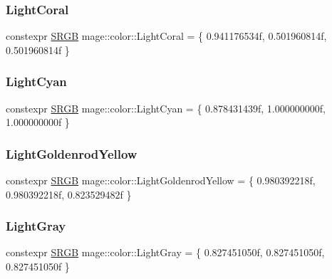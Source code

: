 \hypertarget{namespacemage_1_1color_a8cadd437a344e0286c3f2575ba343b45}{}\label{namespacemage_1_1color_a8cadd437a344e0286c3f2575ba343b45} 
\subsubsection{\texorpdfstring{Light\+Coral}{LightCoral}}
{\footnotesize\ttfamily constexpr \hyperlink{structmage_1_1_s_r_g_b}{S\+R\+GB} mage\+::color\+::\+Light\+Coral = \{ 0.\+941176534f, 0.\+501960814f, 0.\+501960814f \}}

\hypertarget{namespacemage_1_1color_a910b1675afba007acc808663c033b5a8}{}\label{namespacemage_1_1color_a910b1675afba007acc808663c033b5a8} 
\subsubsection{\texorpdfstring{Light\+Cyan}{LightCyan}}
{\footnotesize\ttfamily constexpr \hyperlink{structmage_1_1_s_r_g_b}{S\+R\+GB} mage\+::color\+::\+Light\+Cyan = \{ 0.\+878431439f, 1.\+000000000f, 1.\+000000000f \}}

\hypertarget{namespacemage_1_1color_ae066f83c103109c2b2764cfefdb7dcd8}{}\label{namespacemage_1_1color_ae066f83c103109c2b2764cfefdb7dcd8} 
\subsubsection{\texorpdfstring{Light\+Goldenrod\+Yellow}{LightGoldenrodYellow}}
{\footnotesize\ttfamily constexpr \hyperlink{structmage_1_1_s_r_g_b}{S\+R\+GB} mage\+::color\+::\+Light\+Goldenrod\+Yellow = \{ 0.\+980392218f, 0.\+980392218f, 0.\+823529482f \}}

\hypertarget{namespacemage_1_1color_a185dc26aaaed259e69cfab401acb1176}{}\label{namespacemage_1_1color_a185dc26aaaed259e69cfab401acb1176} 
\subsubsection{\texorpdfstring{Light\+Gray}{LightGray}}
{\footnotesize\ttfamily constexpr \hyperlink{structmage_1_1_s_r_g_b}{S\+R\+GB} mage\+::color\+::\+Light\+Gray = \{ 0.\+827451050f, 0.\+827451050f, 0.\+827451050f \}}

